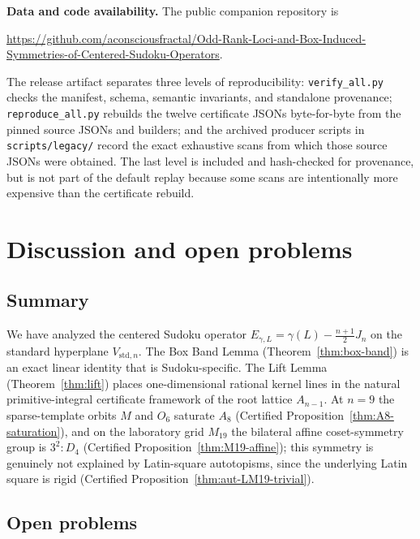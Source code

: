 \documentclass[11pt,a4paper]{article}
\theoremstyle{definition}
\theoremstyle{remark}
\newcommand{\Vstdn}{V_{\mathrm{std},n}}
\newcommand{\Egamma}{E_{\gamma,L}}
\newcommand{\AffDfour}{3^{2}{:}D_4}
\begin{document}
\smallskip
\noindent\textbf{Data and code availability.} The public companion
repository is
\begin{center}
\url{https://github.com/aconsciousfractal/Odd-Rank-Loci-and-Box-Induced-Symmetries-of-Centered-Sudoku-Operators}.
\end{center}
The release artifact separates three levels of reproducibility:
\texttt{verify\_all.py} checks the manifest, schema, semantic invariants,
and standalone provenance; \texttt{reproduce\_all.py} rebuilds the twelve
certificate JSONs byte-for-byte from the pinned source JSONs and builders;
and the archived producer scripts in \texttt{scripts/legacy/} record the
exact exhaustive scans from which those source JSONs were obtained. The
last level is included and hash-checked for provenance, but is not part of
the default replay because some scans are intentionally more expensive
than the certificate rebuild.

\section{Discussion and open problems}\label{sec:discussion}

\subsection{Summary}\label{sec:disc-summary}

We have analyzed the centered Sudoku operator
$\Egamma = \gamma(L) - \tfrac{n+1}{2} J_n$ on the standard hyperplane
$\Vstdn$. The Box Band Lemma (Theorem~\ref{thm:box-band}) is an
exact linear identity that is Sudoku-specific. The Lift Lemma
(Theorem~\ref{thm:lift}) places one-dimensional rational kernel lines
in the natural primitive-integral certificate framework of the root
lattice $A_{n-1}$. At $n = 9$ the sparse-template orbits
$M$ and $O_6$ saturate $A_8$ (Certified Proposition~\ref{thm:A8-saturation}), and
on the laboratory grid $M_{19}$ the bilateral affine coset-symmetry
group is $\AffDfour$ (Certified Proposition~\ref{thm:M19-affine}); this symmetry is genuinely
not explained by Latin-square autotopisms, since the underlying Latin
square is rigid (Certified Proposition~\ref{thm:aut-LM19-trivial}).

\subsection{Open problems}\label{sec:disc-open}
\end{document}
